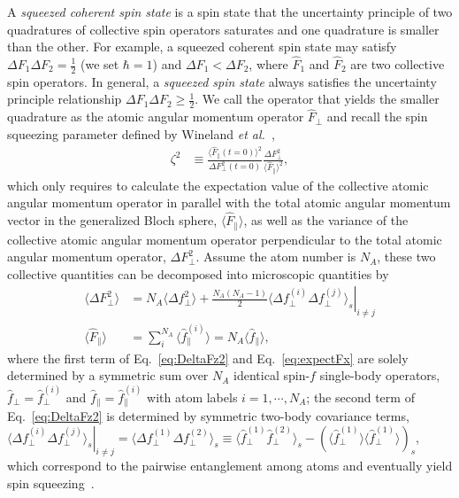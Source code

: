 \documentclass[pra,twocolumn,floatfix,superscriptaddress]{revtex4-1} %
\newcommand{\expect}[1]{\big\langle #1 \big\rangle}
\begin{document}
A \textit{squeezed coherent spin state} is a spin state that the uncertainty principle of two quadratures of collective spin operators saturates and one quadrature is smaller than the other. 
For example, a squeezed coherent spin state may satisfy $ \Delta F_1\Delta F_2=\frac{1}{2} $ (we set $ \hbar=1 $) and $ \Delta F_1<\Delta F_2 $, where $ \hat{F}_1 $ and $ \hat{F}_2 $ are two collective spin operators. 
In general, a \textit{squeezed spin state} always satisfies the uncertainty principle relationship $ \Delta F_1\Delta F_2\ge\frac{1}{2} $.
We call the operator that yields the smaller quadrature as the atomic angular momentum operator $ \hat{F}_\perp $ and 
recall the spin squeezing parameter defined by Wineland {\emph{et al.}}~\cite{Wineland1992},
\begin{align}
\zeta^2 &\equiv \frac{\expect{\hat{F}_\parallel(t=0)}^2}{\Delta F_\perp^2(t=0)} \frac{\Delta F_\perp^2}{\expect{\hat{F}_\parallel}^2},
\end{align}
which only requires to calculate the expectation value of the collective atomic angular momentum operator in parallel with the total atomic angular momentum vector in the generalized Bloch sphere, $ \expect{\hat{F}_\parallel} $, as well as the variance of the collective atomic angular momentum operator perpendicular to the total atomic angular momentum operator, $ \Delta F_\perp^2 $. 
Assume the atom number is $ N_A $, these two collective quantities can be decomposed into microscopic quantities by 
\begin{align}
\expect{\Delta F_\perp^2} &= N_A \expect{\Delta f_\perp^2}+\frac{N_A(N_A-1)}{2}\left. \expect{\Delta f_\perp^{(i)}\Delta f_\perp^{(j)}}_s\right|_{i\neq j}\label{eq:DeltaFz2}\\
\expect{\hat{F}_\parallel } &= \sum_i^{N_A} \expect{\hat{f}_\parallel ^{(i)}}=N_A \expect{\hat{f}_\parallel},\label{eq:expectFx}
\end{align}
where the first term of Eq.~\eqref{eq:DeltaFz2} and Eq.~\eqref{eq:expectFx} are solely determined by a symmetric sum over $N_A$ identical spin-$f$ single-body operators, $ \hat{f}_\perp=\hat{f}_\perp^{(i)} $ and $ \hat{f}_\parallel=\hat{f}_\parallel^{(i)} $ with atom labels $ i=1,\cdots,N_A $; the second term of Eq.~\eqref{eq:DeltaFz2} is determined by symmetric two-body covariance terms, $ \left.\expect{\Delta f_\perp^{(i)}\Delta f_\perp^{(j)}}_s\right|_{i\neq j}=\expect{\Delta f_\perp^{(1)}\Delta f_\perp^{(2)}}_s\equiv \expect{\hat{f}_\perp^{(1)}\hat{f}_\perp^{(2)}}_s-\left( \expect{\hat{f}_\perp^{(1)}} \expect{\hat{f}_\perp^{(1)}}\right)_s $, which correspond to the pairwise entanglement among atoms and eventually yield spin squeezing~\cite{Wang2003Spin}.
\end{document}
